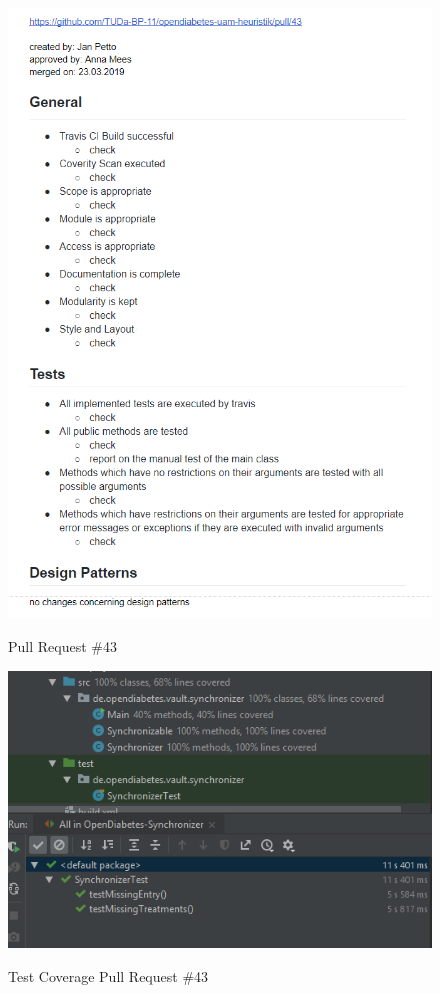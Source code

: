 \documentclass[accentcolor=tud0b,12pt,paper=a4]{tudreport}
\begin{document}
\begin{figure}[h]
\centering
\caption{Pull Request \#43}
\includegraphics[width=\textwidth,height=\textheight,keepaspectratio]{pr-43}
\label{pr:43}
\end{figure}

\begin{figure}[h]
\centering
\caption{Test Coverage Pull Request \#43}
\includegraphics[width=\textwidth,height=\textheight,keepaspectratio]{pr-cov-43}
\label{pr-cov:43}
\end{figure}
\end{document}
